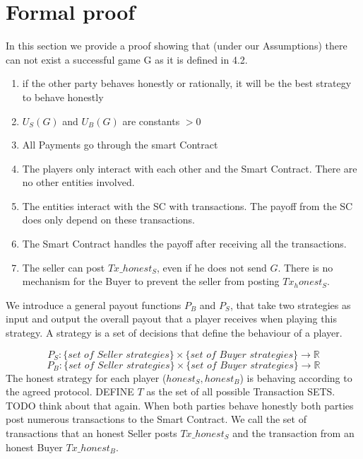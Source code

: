 \documentclass{cacthesis}
\begin{document}
\section{Formal proof}
In this section we provide a proof showing that (under our Assumptions) there can not exist  a successful game G as it is defined in 4.2.

\begin{enumerate}
    \item if the other party behaves honestly or rationally, it will be the best strategy to behave honestly
    \item $U_S(G)$ and $U_B(G)$ are constants $> 0$
    \item All Payments go through the smart Contract
    \item The players only interact with each other and the Smart Contract. There are no other entities involved.
    \item The entities interact with the SC with transactions. The payoff from the SC does only depend on these transactions.
    \item The Smart Contract handles the payoff after receiving all the transactions.
    \item The seller can post $Tx\_honest_S$, even if he does not send $G$. There is no mechanism for the Buyer to prevent the seller from posting $Tx_honest_S$.

\end{enumerate}


We introduce a general payout functions $P_B$ and $P_S$, that take two strategies as input and output the overall payout that a player receives when playing this strategy.\newline
A strategy is a set of decisions that define the behaviour of a player. %


\[P_S : \{ \textit{set of Seller strategies}\} \times \{ \textit{set of Buyer strategies}\} \to \mathbb{R}\]
\[P_B : \{ \textit{set of Seller strategies}\} \times \{ \textit{set of Buyer strategies}\} \to \mathbb{R}\]
The honest strategy for each player ($honest_S, honest_B$) is behaving according to the agreed protocol.
DEFINE $T$ as the set of all possible Transaction SETS. TODO think about that again.\newline
When both parties behave honestly both parties post numerous transactions to the Smart Contract. We call the set of transactions that an honest Seller posts $Tx\_honest_S$ and the transaction from an honest Buyer $Tx\_honest_B$.
\end{document}
